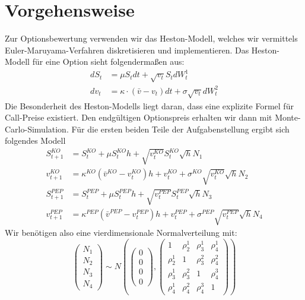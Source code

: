 \documentclass[12pt]{article}
\begin{document}
	\section*{Vorgehensweise}
	Zur Optionsbewertung verwenden wir das Heston-Modell, welches wir vermittels Euler-Maruyama-Verfahren diskretisieren und implementieren.
	Das Heston-Modell für eine Option sieht folgendermaßen aus:
	\begin{align*} 
	dS_t &= \mu S_t dt + \sqrt{v_t} S_t dW^1_t \\
	dv_t &= \kappa\cdot(\bar{v}-v_t) dt + \sigma \sqrt{v_t}dW^2_t 
	\end{align*}
	Die Besonderheit des Heston-Modells liegt daran, dass eine explizite Formel für Call-Preise existiert. Den endgültigen Optionspreis erhalten wir dann mit Monte-Carlo-Simulation. Für die ersten beiden Teile der Aufgabenstellung ergibt sich folgendes Modell
	\begin{align*}
	S^{KO}_{t+1}&=S^{KO}_{t}+\mu S^{KO}_{t}h+\sqrt{v^{KO}_t}S^{KO}_{t}\sqrt{h}N_1\\
	v^{KO}_{t+1}&=\kappa^{KO}(\bar{v}^{KO}-v^{KO}_t)h+v^{KO}_t+\sigma^{KO}\sqrt{v^{KO}_t}\sqrt{h}N_2\\
	S^{PEP}_{t+1}&=S^{PEP}_{t}+\mu S^{PEP}_{t}h+\sqrt{v^{PEP}_t}S^{PEP}_{t}\sqrt{h}N_3\\
	v^{PEP}_{t+1}&=\kappa^{PEP}(\bar{v}^{PEP}-v^{PEP}_t)h+v^{PEP}_t+\sigma^{PEP}\sqrt{v^{PEP}_t}\sqrt{h}N_4
	\end{align*}
	Wir benötigen also eine vierdimensionale Normalverteilung mit:
	\begin{equation*}
	\left({\begin{array}{c} N_1\\ N_2\\ N_3\\ N_4\end{array}}\right) \sim N\left(\left({\begin{array}{c} 0 \\ 0 \\ 0 \\ 0 \end{array}}\right),\left({\begin{array}{cccc} 1 & \rho^1_2 & \rho^1_3 & \rho^1_4\\ \rho^1_2 & 1 & \rho^2_3 & \rho^2_4 \\ \rho^1_3 & \rho^2_3 & 1 & \rho^3_4 \\ \rho^1_4 & \rho^2_4 & \rho^3_4 & 1 \end{array}}\right)\right)
	\end{equation*}
	
\end{document}
